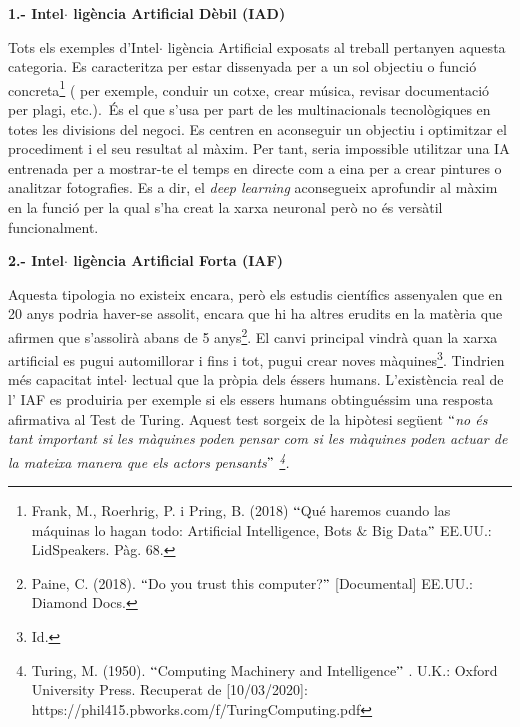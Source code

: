 \documentclass[12pt]{article}
\begin{document}
\vspace{\baselineskip}
\textbf{1.- Intel$ \cdot $ ligència Artificial Dèbil (IAD)}\par


\vspace{\baselineskip}
\begin{justify}
Tots els exemples d’Intel$ \cdot $ ligència Artificial exposats al treball pertanyen aquesta categoria. Es caracteritza per estar dissenyada per a un sol objectiu o funció concreta\footnote{ Frank, M., Roerhrig, P. i Pring, B. (2018) $``$Qué haremos cuando las máquinas lo hagan todo: Artificial Intelligence, Bots $\&$  Big Data$"$  EE.UU.: LidSpeakers. Pàg. 68.  } ( per exemple, conduir un cotxe, crear música, revisar documentació per plagi, etc.).\  És el que s’usa per part de les multinacionals tecnològiques en totes les divisions del negoci. Es centren en aconseguir un objectiu i optimitzar el procediment i el seu resultat al màxim. Per tant, seria impossible utilitzar una IA entrenada per a mostrar-te el temps en directe com a eina per a crear pintures o analitzar fotografies. Es a dir, el \textit{deep learning} aconsegueix aprofundir al màxim en la funció per la qual s’ha creat la xarxa neuronal però no és versàtil funcionalment.
\end{justify}\par


\vspace{\baselineskip}
\textbf{2.- Intel$ \cdot $ ligència Artificial Forta (IAF)}\par


\vspace{\baselineskip}
\begin{justify}
Aquesta tipologia no existeix encara, però els estudis científics assenyalen que en 20 anys podria haver-se assolit, encara que hi ha altres erudits en la matèria que afirmen que s’assolirà abans de 5 anys\footnote{ Paine, C. (2018). $``$Do you trust this computer?$"$  [Documental] EE.UU.: Diamond Docs. }. El canvi principal vindrà quan la xarxa artificial es pugui automillorar i fins i tot, pugui crear noves màquines\footnote{ Id. }. Tindrien més capacitat intel$ \cdot $ lectual que la pròpia dels éssers humans.  L’existència real de l’ IAF es produiria per exemple si els essers humans obtinguéssim una resposta afirmativa al Test de Turing. Aquest test sorgeix de la hipòtesi següent \textit{$``$no és tant important si les màquines poden pensar com si les màquines poden actuar de la mateixa manera que els actors pensants$"$ \footnote{ Turing, M. (1950). $``$Computing Machinery and Intelligence$"$ . U.K.: Oxford University Press. Recuperat de [10/03/2020]: https://phil415.pbworks.com/f/TuringComputing.pdf }. }
\end{justify}\par
\end{document}
